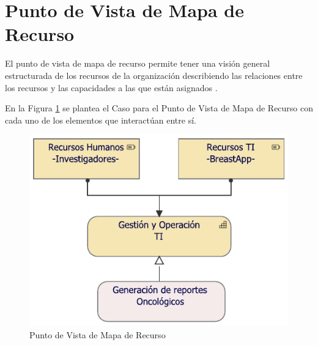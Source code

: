 \newpage
\section{Punto de Vista de Mapa de Recurso}

El punto de vista de mapa de recurso permite tener una visión general estructurada de los recursos de la organización describiendo las  relaciones entre los recursos y las capacidades a las que están asignados \cite{ArchiMate3.0.1}. 

En la Figura \ref{PvMapaRecurso} se plantea el Caso para el Punto de Vista de Mapa de Recurso con cada uno de los elementos que interactúan entre sí. 

\begin{figure}[h!]
	\centering
	\includegraphics[width=0.77\linewidth]{ARQUITECTURA/imgs/CapaEstrategica/4_PvMapaRecurso}
	\caption{Punto de Vista de Mapa de Recurso}
	\label{PvMapaRecurso}
\end{figure}


